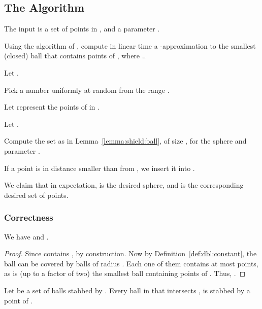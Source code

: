 \InSubmitVer{\documentclass[11pt]{article}}
\numberwithin{figure}{section}
\numberwithin{table}{section}
\numberwithin{equation}{section}
\newcommand{\lemlab}[1]{\label{lemma:#1}}
\newcommand{\lemref}[1]{Lemma~\ref{lemma:#1}}
\newcommand{\defref}[1]{Definition~\ref{def:#1}}
\begin{document}
\subsection{The Algorithm}

The input is a set of points  in , and a parameter .
\begin{compactenum}[\qquad (A)]
    \item Using the algorithm of \cite{hm-facsk-05}, compute in linear
    time a -approximation to the smallest (closed) ball
     that contains  points of , where
    ..
    
    \item Let .
    
    \item Pick a number  uniformly at random from the range
    .
    
    \item Let  represent the points of  in
    .
    
    \item Let .
    
    
    \item Compute the set  as in \lemref{shield:ball}, of
    size , for
    the sphere  and parameter .
    
    \item If a point  is in distance smaller than
     from , we insert it into .
\end{compactenum}
\bigskip

\noindent
We claim that in expectation,  is the desired sphere, and
 is the corresponding desired set of points.

\subsubsection{Correctness}

\begin{lemma}\lemlab{correctness:1}We have  and
    .
\end{lemma}

\begin{proof}
    Since  contains ,
     by
    construction.  Now by \defref{dbl:constant}, the ball  can
    be covered by  balls of radius . Each
    one of them contains at most  points, as 
    is (up to a factor of two) the smallest ball containing  points
    of . Thus, .
\end{proof}


\begin{lemma}
    \lemlab{sphere:separates}Let  be a set of balls stabbed by .  Every ball
    in  that intersects , is stabbed by a point
    of .
\end{lemma}
\end{document}
